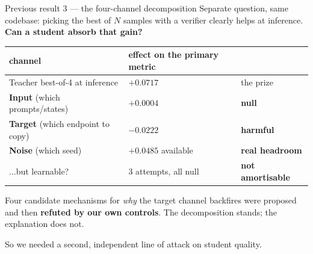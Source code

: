\documentclass[10pt,aspectratio=169]{beamer}
\newcommand{\good}[1]{\textcolor{good}{\textbf{#1}}}
\newcommand{\bad}[1]{\textcolor{bad}{\textbf{#1}}}
\begin{document}
\begin{frame}{Previous result 3 --- the four-channel decomposition}
  Separate question, same codebase: picking the best of $N$ samples with a verifier
  clearly helps at inference. \textbf{Can a student absorb that gain?}

  \vspace{0.6em}
  \begin{center}
  \begin{tabular}{lll}
    \toprule
    channel & effect on the primary metric & \\
    \midrule
    Teacher best-of-4 at inference & $+0.0717$ & the prize \\
    \midrule
    \textbf{Input} (which prompts/states) & $+0.0004$ & \bad{null} \\
    \textbf{Target} (which endpoint to copy) & $-0.0222$ & \bad{harmful} \\
    \textbf{Noise} (which seed) & $+0.0485$ available & \good{real headroom} \\
    \quad ...but learnable? & 3 attempts, all null & \bad{not amortisable} \\
    \bottomrule
  \end{tabular}
  \end{center}

  \vspace{0.6em}
  Four candidate mechanisms for \emph{why} the target channel backfires were proposed and
  then \textbf{refuted by our own controls}. The decomposition stands; the explanation does not.

  \begin{block}{}
    \small So we needed a second, independent line of attack on student quality.
  \end{block}
\end{frame}
\end{document}
